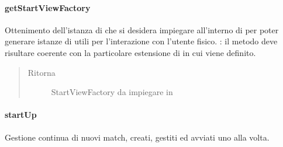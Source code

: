 \documentclass[letterpaper,10pt,italian,openany,oneside]{sphinxmanual}
\begin{document}
\paragraph{getStartViewFactory}
\label{\detokenize{source/it/unicam/cs/pa/mastermind/gamecore/MainManager:getstartviewfactory}}

\begin{fulllineitems}
\label{\detokenize{source/it/unicam/cs/pa/mastermind/gamecore/MainManager:it.unicam.cs.pa.mastermind.gamecore.MainManager.getStartViewFactory()}}
Ottenimento dell’istanza di  che si desidera impiegare all’interno di  per poter generare istanze di  utili per l’interazione con l’utente fisico. : il metodo deve risultare coerente con la particolare estensione di  in cui viene definito.
\begin{quote}\begin{description}
\item[{Ritorna}] \leavevmode
StartViewFactory da impiegare in 

\end{description}\end{quote}

\end{fulllineitems}



\paragraph{startUp}
\label{\detokenize{source/it/unicam/cs/pa/mastermind/gamecore/MainManager:startup}}

\begin{fulllineitems}
\label{\detokenize{source/it/unicam/cs/pa/mastermind/gamecore/MainManager:it.unicam.cs.pa.mastermind.gamecore.MainManager.startUp()}}
Gestione continua di nuovi match, creati, gestiti ed avviati uno alla volta.

\end{fulllineitems}
\end{document}
